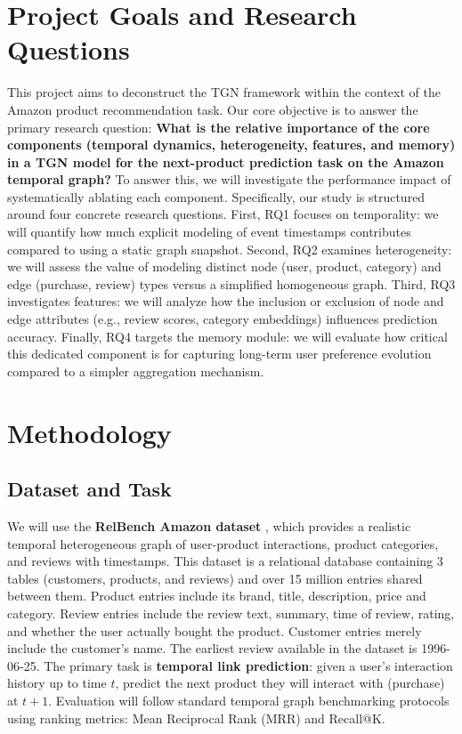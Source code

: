 \documentclass[sigconf]{acmart}
\begin{document}
\section{Project Goals and Research Questions}
This project aims to deconstruct the TGN framework within the context of the Amazon product recommendation task. Our core objective is to answer the primary research question: \textbf{What is the relative importance of the core components (temporal dynamics, heterogeneity, features, and memory) in a TGN model for the next-product prediction task on the Amazon temporal graph?} To answer this, we will investigate the performance impact of systematically ablating each component. Specifically, our study is structured around four concrete research questions. First, RQ1 focuses on temporality: we will quantify how much explicit modeling of event timestamps contributes compared to using a static graph snapshot. Second, RQ2 examines heterogeneity: we will assess the value of modeling distinct node (user, product, category) and edge (purchase, review) types versus a simplified homogeneous graph. Third, RQ3 investigates features: we will analyze how the inclusion or exclusion of node and edge attributes (e.g., review scores, category embeddings) influences prediction accuracy. Finally, RQ4 targets the memory module: we will evaluate how critical this dedicated component is for capturing long-term user preference evolution compared to a simpler aggregation mechanism.

\section{Methodology}
\subsection{Dataset and Task}
We will use the \textbf{RelBench Amazon dataset} \cite{robinson2024relbench}, which provides a realistic temporal heterogeneous graph of user-product interactions, product categories, and reviews with timestamps. This dataset is a relational database containing 3 tables (customers, products, and reviews) and over 15 million entries shared between them. Product entries include its brand, title, description, price and category. Review entries include the review text, summary, time of review, rating, and whether the user actually bought the product. Customer entries merely include the customer's name. The earliest review available in the dataset is 1996-06-25. The primary task is \textbf{temporal link prediction}: given a user's interaction history up to time \(t\), predict the next product they will interact with (purchase) at \(t+1\). Evaluation will follow standard temporal graph benchmarking protocols using ranking metrics: Mean Reciprocal Rank (MRR) and Recall@K.
\end{document}
